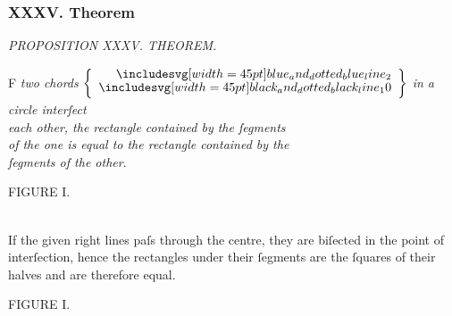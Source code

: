 \documentclass[12pt,preview]{standalone}
\begin{document}
\subsubsection{XXXV. Theorem}

\begin{minipage}[t]{0.64\textwidth}

    \begin{center}
        \textit{PROPOSITION XXXV. THEOREM.}\label{book3pr35} \\
    \end{center}

    \hfill

    \begin{center}
        \raggedright \lettrine[lines=4, loversize=1, nindent=0pt]{}{}F \textit{two chords} $\left\{\begin{aligned}\bimg{blue_and_dotted_blue_line_2} \\[-2ex] \bimg{black_and_dotted_black_line_10} \end{aligned}\right\}$ \textit{in a circle interſect\\ each other, the rectangle contained by the ſegments\\ of the one is equal to the rectangle contained by the\\ ſegments of the other}.
    \end{center}
\end{minipage}%

\hfill

\begin{minipage}[t]{0.64\textwidth}
    \vspace{0pt}

    \begin{center}
        FIGURE I.\\
        \hfill\\
        \raggedright If the given right lines paſs through the centre, they are biſected in the point of interſection, hence the rectangles under their ſegments are the ſquares of their halves and are therefore equal.
    \end{center}
\end{minipage}%
\hfill
\begin{minipage}[t]{0.33\textwidth}
    \vspace{0pt}
    \begin{center}
        FIGURE I.
    \end{center}
    \hfill\\
    
\end{minipage}%
\end{document}
